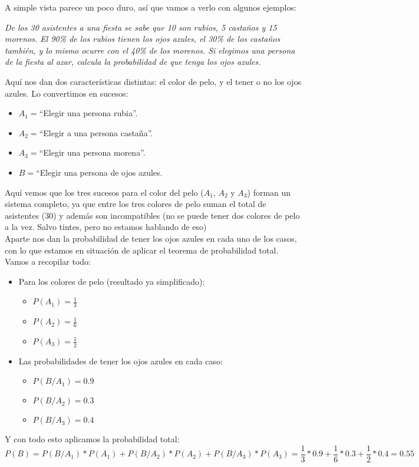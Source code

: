 \documentclass[a4paper,10pt,answers]{exam}
\begin{document}
A simple vista parece un poco duro, así que vamos a verlo con algunos ejemplos:\\
\begin{questions}
\question\emph{De los 30 asistentes a una fiesta se sabe que 10 son rubios, 5 castaños y 15 morenos. El
90\% de los rubios tienen los ojos azules, el 30\% de los castaños también, y lo mismo ocurre con el 40\%
de los morenos. Si elegimos una persona de la fiesta al azar, calcula la probabilidad de que tenga los ojos azules.}
\begin{solution}
Aquí nos dan dos características distintas: el color de pelo, y el tener o no los ojos azules. Lo convertimos en sucesos:
\begin{itemize}
	\item $A_1=$``Elegir una persona rubia''.
	\item $A_2=$``Elegir a una persona castaña''.
	\item $A_3=$``Elegir una persona morena''.
	\item $B=$``Elegir una persona de ojos azules.
\end{itemize}
Aquí vemos que los tres sucesos para el color del pelo ($A_1$, $A_2$ y $A_3$) forman un sistema completo, ya que entre los tres colores de pelo suman el total de asistentes (30) y además son incompatibles (no se puede tener dos colores de pelo a la vez. Salvo tintes, pero no estamos hablando de eso)\\
Aparte nos dan la probabilidad de tener los ojos azules en cada uno de los casos, con lo que estamos en situación de aplicar el teorema de probabilidad total.\\
Vamos a recopilar todo:
\begin{itemize}
	\item Para los colores de pelo (resultado ya simplificado):
	\begin{itemize}
		\item $P(A_1) = \frac{1}{3}$
		\item $P(A_2) = \frac{1}{6}$
		\item $P(A_3)  = \frac{1}{2}$
	\end{itemize}
	\item Las probabilidades de tener los ojos azules en cada caso:
	\begin{itemize}
		\item $P(B/A_1) = 0.9$
		\item $P(B/A_2) = 0.3$
		\item $P(B/A_3) = 0.4$
	\end{itemize}
\end{itemize}
Y con todo esto aplicamos la probabilidad total:
\[P(B) = P(B/A_1) * P (A_1) + P(B/A_2) * P (A_2) + P(B/A_3) * P (A_3) = \frac{1}{3} * 0.9 + \frac{1}{6} * 0.3 + \frac{1}{2} * 0.4 = 0.55\]
\end{solution}
\end{questions}
\end{document}

